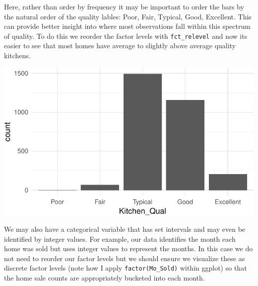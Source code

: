 \documentclass[]{article}
\newenvironment{Shaded}{\begin{snugshade}}{\end{snugshade}}
\newcommand{\KeywordTok}[1]{\textcolor[rgb]{0.13,0.29,0.53}{\textbf{#1}}}
\newcommand{\DataTypeTok}[1]{\textcolor[rgb]{0.13,0.29,0.53}{#1}}
\newcommand{\StringTok}[1]{\textcolor[rgb]{0.31,0.60,0.02}{#1}}
\newcommand{\OperatorTok}[1]{\textcolor[rgb]{0.81,0.36,0.00}{\textbf{#1}}}
\newcommand{\NormalTok}[1]{#1}
\begin{document}
Here, rather than order by frequency it may be important to order the
bars by the natural order of the quality lables: Poor, Fair, Typical,
Good, Excellent. This can provide better insight into where most
observations fall within this spectrum of quality. To do this we reorder
the factor levels with \texttt{fct\_relevel} and now its easier to see
that most homes have average to slightly above average quality kitchens.

\begin{Shaded}
\end{Shaded}

\begin{center}\includegraphics{Chapter_3_-_Visualization_files/figure-latex/ord2-1} \end{center}

We may also have a categorical variable that has set intervals and may
even be identified by integer values. For example, our data identifies
the month each home was sold but uses integer values to represent the
months. In this case we do not need to reorder our factor levels but we
should ensure we visualize these as discrete factor levels (note how I
apply \texttt{factor(Mo\_Sold)} within ggplot) so that the home sale
counts are appropriately bucketed into each month.
\end{document}
